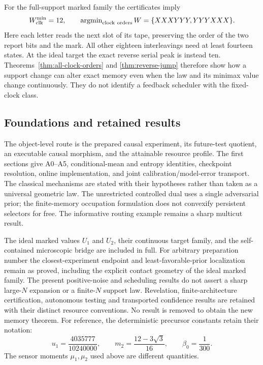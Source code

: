 For the full-support marked family the certificates imply
\[
  W_{\rm clk}^{\min}=12,
  \qquad \operatorname{argmin}_{\rm clock\ orders}W
                       =\{XXXYYY,YYYXXX\}.
\]
Here each letter reads the next slot of its tape, preserving the order
of the two report bits and the mark. All other eighteen interleavings
need at least fourteen states. At the ideal target the exact reverse
serial peak is instead ten. Theorems~\ref{thm:all-clock-orders} and
\ref{thm:reverse-jump} therefore show how a support change can alter
exact memory even when the law and its minimax value change continuously.
They do not identify a feedback scheduler with the fixed-clock class.

\subsection{Foundations and retained results}
The object-level route is the prepared causal experiment, its
future-test quotient, an executable causal morphism, and the attainable
resource profile. The first sections give A0--A5, conditional-mean and
entropy identities, checkpoint resolution, online implementation, and
joint calibration/model-error transport. The classical mechanisms are
stated with their hypotheses rather than taken as a universal geometric
law. The unrestricted controlled dual uses a single adversarial prior;
the finite-memory occupation formulation does not convexify persistent
selectors for free. The informative routing example remains a sharp
multicut result.

The ideal marked values $U_1$ and $U_2$, their continuous target family,
and the self-contained microscopic bridge are included in full. For
arbitrary preparation number the closest-experiment endpoint and
least-favorable-prior localization remain as proved, including the
explicit contact geometry of the ideal marked family. The present
positive-noise and scheduling results do not assert a sharp large-$N$
expansion or a finite-$N$ support law. Revelation, finite-architecture
certification, autonomous testing and transported confidence results
are retained with their distinct resource conventions. No result is
removed to obtain the new memory theorem.
For reference, the deterministic precursor constants retain their notation:
\begin{equation}\label{eq:constants}
 u_1=\frac{4035777}{10240000},\qquad
 m_2=\frac{12-3\sqrt3}{16},\qquad\beta_0=\frac1{300}.
\end{equation}
The sensor moments $\mu_1,\mu_2$ used above are different quantities.


